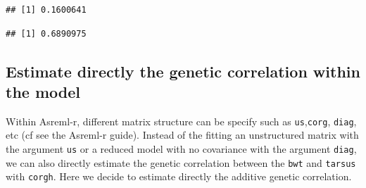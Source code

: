 \documentclass[
  12pt,
]{book}
\newenvironment{Shaded}{\begin{snugshade}}{\end{snugshade}}
\newcommand{\DecValTok}[1]{\textcolor[rgb]{0.00,0.00,0.81}{#1}}
\newcommand{\FunctionTok}[1]{\textcolor[rgb]{0.00,0.00,0.00}{#1}}
\newcommand{\NormalTok}[1]{#1}
\newcommand{\SpecialCharTok}[1]{\textcolor[rgb]{0.00,0.00,0.00}{#1}}
\begin{document}
\begin{Shaded}
\end{Shaded}

\begin{verbatim}
## [1] 0.1600641
\end{verbatim}

\begin{Shaded}
\end{Shaded}

\begin{verbatim}
## [1] 0.6890975
\end{verbatim}

\hypertarget{estimate-directly-the-genetic-correlation-within-the-model}{%
\subsection{Estimate directly the genetic correlation within the model}\label{estimate-directly-the-genetic-correlation-within-the-model}}

Within Asreml-r, different matrix structure can be specify such as \texttt{us},\texttt{corg}, \texttt{diag}, etc (cf see the Asreml-r guide). Instead of the fitting an unstructured matrix with the argument \texttt{us} or a reduced model with no covariance with the argument \texttt{diag}, we can also directly estimate the genetic correlation between the \texttt{bwt} and \texttt{tarsus} with \texttt{corgh}.
Here we decide to estimate directly the additive genetic correlation.
\end{document}
